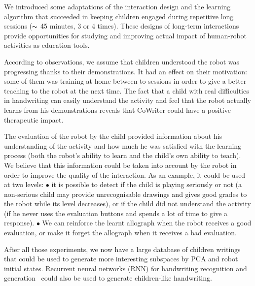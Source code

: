 \documentclass{sig-alternate}
\begin{document}
We introduced some adaptations of
the interaction design and the learning algorithm that succeeded in keeping
children engaged during repetitive long sessions ($\thicksim$ 45 minutes, 3 or 4 times).
These designs of long-term interactions provide
opportunities for studying and improving actual impact of human-robot activities as
education tools.

According to observations, we assume that children understood the robot was progressing thanks to their demonstrations. It had an effect on their motivation: some of them was training at home between to sessions in order to give a better teaching to the robot at the next time.
The fact that a child with real difficulties in handwriting can easily
understand the activity and feel that the robot actually learns from his
demonstrations reveals that CoWriter could have a positive therapeutic impact.

The evaluation of the robot by the child provided information about his
understanding of the activity and how much he was satisfied with the
learning process (both the robot's ability to learn and the child's own
ability to teach). We believe that this information could be taken into account by
the robot in order to improve the quality of the interaction. As an example, it
could be used at two levels: $\bullet$ it is possible to detect if the child is playing
seriously or not (a non-serious child may provide unrecognisable drawings and gives good grades to
the robot while its level decreases), or if the child did not understand the
activity (if he never uses the evaluation buttons and spends a lot of time to
give a response). $\bullet$ We can reinforce the learnt allograph when the robot
receives a good evaluation, or make it forget the allograph when it
receives a bad evaluation.

After all those
experiments, we now have a large database of children writings that could be
used to generate more interesting subspaces by PCA and robot initial states. 
Recurrent neural networks (RNN) for handwriting recognition and generation~\cite{DBLP:journals/corr/Graves13} could also be used to generate 
children-like handwriting.





 
\end{document}
